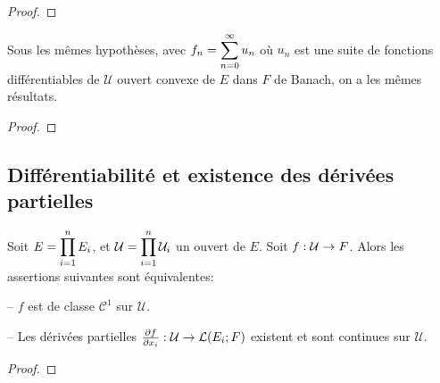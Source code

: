 \ifdefined\outputproof
\begin{proof}
	
\end{proof}
\fi

\begin{corollary}
	Sous les mêmes hypothèses, avec $f_{n} = \displaystyle \sum_{n = 0}^{\infty} u_{n}$ où
	$u_{n}$ est une suite de fonctions différentiables de $\mathcal{U}$ ouvert
	convexe de $E$ dans $F$ de Banach, on a les mêmes résultats.
\end{corollary}

\ifdefined\outputproof
\begin{proof}
	
\end{proof}
\fi

\subsection{Différentiabilité et existence des dérivées partielles}

\begin{theorem}
\label{theorem_partial_derivative_existence}

	Soit $E = \displaystyle \prod_{i = 1}^{n} E_{i}$, et $\mathcal{U} =
	\displaystyle \prod_{i = 1}^{n} \mathcal{U}_{i}$ un ouvert de $E$.
	Soit $f : \mathcal{U} \rightarrow F$.
	Alors les assertions suivantes sont équivalentes:
	
	-- $f$ est de classe $\mathcal{C}^{1}$ sur $\mathcal{U}$.

	-- Les dérivées partielles 
	$\pdv{f}{x_{i}} : \mathcal{U} \rightarrow \mathcal{L}(E_{i}; F)$
	existent et sont continues sur $\mathcal{U}$.
\end{theorem}

\ifdefined\outputproof
\begin{proof}
	
\end{proof}
\fi
